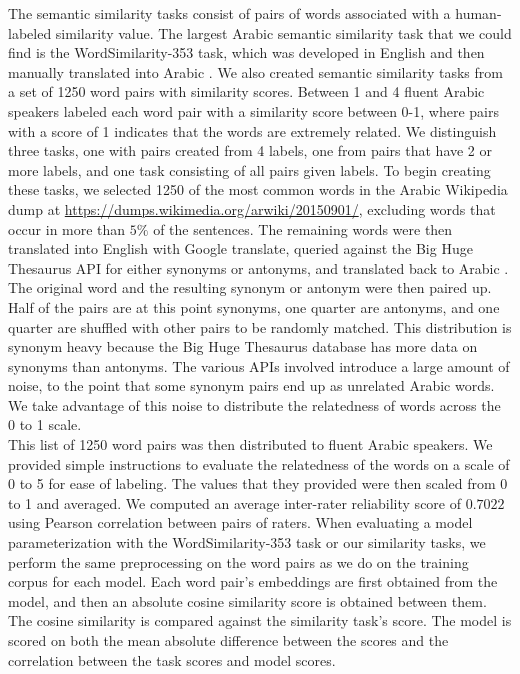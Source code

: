 The semantic similarity tasks consist of pairs of words associated with a human-labeled similarity value. The largest Arabic semantic similarity task that we could find is the WordSimilarity-353 task, which was developed in English and then manually translated into Arabic \cite{finkelstein:2001,hassan:2009}. 
We also created semantic similarity tasks from a set of 1250 word pairs with similarity scores. Between 1 and 4 fluent Arabic speakers labeled each word pair with a similarity score between 0-1, where pairs with a score of 1 indicates that the words are extremely related. We distinguish three tasks, one with pairs created from 4 labels, one from pairs that have 2 or more labels, and one task consisting of all pairs given labels. To begin creating these tasks, we selected 1250 of the most common words in the Arabic Wikipedia dump \cite{wiki:xxx} at \url{https://dumps.wikimedia.org/arwiki/20150901/}, excluding words that occur in more than $5\%$ of the sentences. The remaining words were then translated into English with Google translate, queried against the Big Huge Thesaurus API for either synonyms or antonyms, and translated back to Arabic \cite{google:online,bhl:online}. The original word and the resulting synonym or antonym were then paired up. Half of the pairs are at this point synonyms, one quarter are antonyms, and one quarter are shuffled with other pairs to be randomly matched. This distribution is synonym heavy because the Big Huge Thesaurus database has more data on synonyms than antonyms. The various APIs involved introduce a large amount of noise, to the point that some synonym pairs end up as unrelated Arabic words. We take advantage of this noise to distribute the relatedness of words across the 0 to 1 scale.
\\
This list of 1250 word pairs was then distributed to fluent Arabic speakers. We provided simple instructions to evaluate the relatedness of the words on a scale of 0 to 5 for ease of labeling. The values that they provided were then scaled from 0 to 1 and averaged. We computed an average inter-rater reliability score of $0.7022$ using Pearson correlation between pairs of raters.
When evaluating a model parameterization with the WordSimilarity-353 task or our similarity tasks, we perform the same preprocessing on the word pairs as we do on the training corpus for each model. Each word pair's embeddings are first obtained from the model, and then an absolute cosine similarity score is obtained between them. The cosine similarity is compared against the similarity task's score. The model is scored on both the mean absolute difference between the scores and the correlation between the task scores and model scores.



